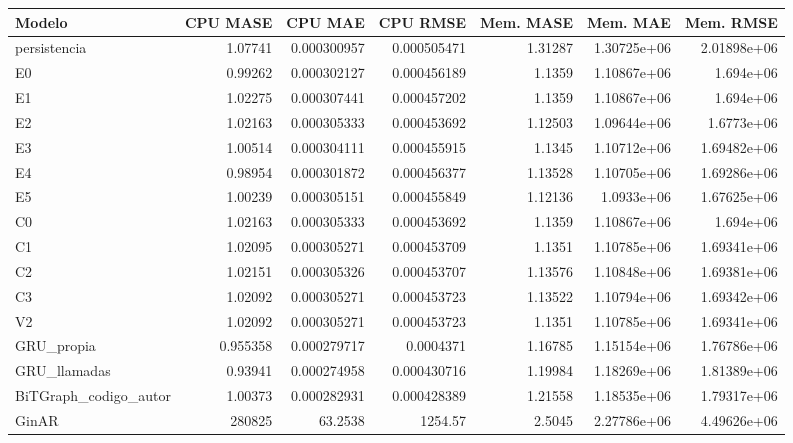 \begin{tabular}{lrrrrrr}
\toprule
Modelo & CPU MASE & CPU MAE & CPU RMSE & Mem. MASE & Mem. MAE & Mem. RMSE \\
\midrule
persistencia & 1.07741 & 0.000300957 & 0.000505471 & 1.31287 & 1.30725e+06 & 2.01898e+06 \\
E0 & 0.99262 & 0.000302127 & 0.000456189 & 1.1359 & 1.10867e+06 & 1.694e+06 \\
E1 & 1.02275 & 0.000307441 & 0.000457202 & 1.1359 & 1.10867e+06 & 1.694e+06 \\
E2 & 1.02163 & 0.000305333 & 0.000453692 & 1.12503 & 1.09644e+06 & 1.6773e+06 \\
E3 & 1.00514 & 0.000304111 & 0.000455915 & 1.1345 & 1.10712e+06 & 1.69482e+06 \\
E4 & 0.98954 & 0.000301872 & 0.000456377 & 1.13528 & 1.10705e+06 & 1.69286e+06 \\
E5 & 1.00239 & 0.000305151 & 0.000455849 & 1.12136 & 1.0933e+06 & 1.67625e+06 \\
C0 & 1.02163 & 0.000305333 & 0.000453692 & 1.1359 & 1.10867e+06 & 1.694e+06 \\
C1 & 1.02095 & 0.000305271 & 0.000453709 & 1.1351 & 1.10785e+06 & 1.69341e+06 \\
C2 & 1.02151 & 0.000305326 & 0.000453707 & 1.13576 & 1.10848e+06 & 1.69381e+06 \\
C3 & 1.02092 & 0.000305271 & 0.000453723 & 1.13522 & 1.10794e+06 & 1.69342e+06 \\
V2 & 1.02092 & 0.000305271 & 0.000453723 & 1.1351 & 1.10785e+06 & 1.69341e+06 \\
GRU\_propia & 0.955358 & 0.000279717 & 0.0004371 & 1.16785 & 1.15154e+06 & 1.76786e+06 \\
GRU\_llamadas & 0.93941 & 0.000274958 & 0.000430716 & 1.19984 & 1.18269e+06 & 1.81389e+06 \\
BiTGraph\_codigo\_autor & 1.00373 & 0.000282931 & 0.000428389 & 1.21558 & 1.18535e+06 & 1.79317e+06 \\
GinAR & 280825 & 63.2538 & 1254.57 & 2.5045 & 2.27786e+06 & 4.49626e+06 \\
\bottomrule
\end{tabular}